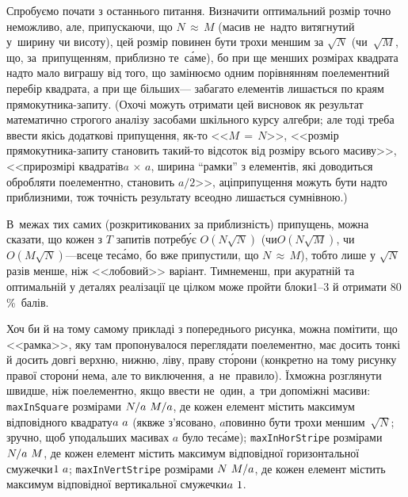 Спробуємо почати з останнього питання. Визначити оптимальний розмір точно неможливо, але, припускаючи, що $N\,{\approx}\,M$ (масив не~надто витягнутий у~ширину чи висоту), цей розмір повинен бути трохи меншим за $\sqrt{N}$ (чи~$\sqrt{M}$, що, за~припущенням, приблизно те~с\'{а}ме), бо при ще менших розмірах квадрата надто мало виграшу від того, що замінюємо одним порівнянням поелементний перебір квадрата, а при ще більших\nolinebreak[3] --- забагато елементів лишається по краям прямокутника-запиту. (Охочі можуть отримати цей висновок як результат математично строгого аналізу засобами шкільного курсу алгебри; але тоді треба ввести якісь додаткові припущення, як-то <<${M\,{=}\,N}$>>, <<розмір прямокутника-запиту становить такий-то відсоток від розміру всього масиву>>, <<при\nolinebreak[2] розмірі квадратів\nolinebreak[2] ${a\,{\times}\,a}$, ширина ``рамки'' з елементів, які доводиться обробляти поелементно, становить $a/2$>>, а\nolinebreak[2] ці\nolinebreak[2] припущення можуть бути надто приблизними, тож точність результату все\nolinebreak[3] одно лишається сумнівною.)

В~межах тих самих (розкритикованих за приблизність) припущень, можна сказати, що кожен з $T$ запитів потреб\'{у}є $O(N\sqrt{N})$ (чи\nolinebreak[3] $O(N\sqrt{M})$, чи\nolinebreak[3] $O(M\sqrt{N})$\nolinebreak[3] ---\linebreak[2] все\nolinebreak[2] це те\nolinebreak[3] с\'{а}мо, бо вже припустили, що $N\,{\approx}\,M$), тобто лише у $\sqrt{N}$ разів менше, ніж <<лобовий>> варіант. Тим\nolinebreak[3] не\nolinebreak[3] менш, при акуратній та оптимальній у деталях реалізації це цілком може пройти блоки\nolinebreak[3] \mbox{1--3} й отримати 80$\,$\%~балів.


Хоч би й на тому самому прикладі з попереднього рисунка, можна помітити, що <<рамка>>, яку там пропонувалося переглядати поелементно, має досить тонкі й досить довгі верхню, нижню, ліву, праву ст\'{о}рони (конкретно на тому рисунку правої сторон\'{и} нема, але то виключення, а~не~правило). Їх\nolinebreak[2] можна розглянути швидше, ніж поелементно, якщо ввести не~один, а~три допоміжні масиви: 
\texttt{maxInSquare} розмірами ${N/a\,{\*}\,M/a}$, де кожен елемент містить максимум відповідного квадрату\nolinebreak[2] ${a\,{\*}\,a}$ (як\nolinebreak[3] вже з'ясовано, $a$\nolinebreak[3] повинно бути трохи меншим~$\sqrt{N}$; зручно, щоб у\nolinebreak[3] подальших масивах $a$ було те\nolinebreak[3] с\'{а}ме);
\texttt{maxInHorStripe} розмірами ${N/a\,{\*}\,M}$, де кожен елемент містить максимум відповідної горизонтальної смужечки\nolinebreak[2] ${1\,{\*}\,a}$; 
\texttt{maxInVertStripe} розмірами ${N\,{\*}\,M/a}$, де кожен елемент містить максимум відповідної вертикальної смужечки\nolinebreak[2] ${a\,{\*}\,1}$. 

